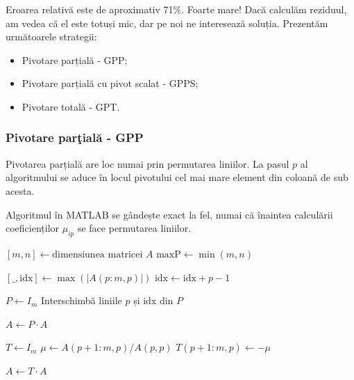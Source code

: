 \documentclass{exam}
\newcommand{\octavescript}[2]{
	
}
\begin{document}
Eroarea relativă este de aproximativ 71\%. Foarte mare! Dacă calculăm reziduul,
am vedea că el este totuși mic, dar pe noi ne interesează soluția. Prezentăm
următoarele strategii:

\begin{itemize}
	\item Pivotare parțială - GPP;
	\item Pivotare parțială cu pivot scalat - GPPS;
	\item Pivotare totală - GPT.
\end{itemize}

\subsubsection{Pivotare parţială - GPP}

Pivotarea parțială are loc numai prin permutarea liniilor. La pasul $p$ al
algoritmului se aduce în locul pivotului cel mai mare element din coloană de sub
acesta.

Algoritmul în MATLAB se gândește exact la fel, numai că înaintea calculării
coeficienților $\mu_{ip}$ se face permutarea liniilor.

\begin{algorithm}
	\caption{Eliminare Gaussiană cu pivotare parțială}
	\begin{algorithmic}[1]
		\State \( [m, n] \gets \text{dimensiunea matricei } A \)
		\State \( \text{maxP} \gets \min(m, n) \) 

		\State \( [\_, \text{idx}] \gets \max(|A(p:m, p)|) \) 
		\State \( \text{idx} \gets \text{idx} + p - 1 \) 

		\State \( P \gets I_m \) 
		\State Interschimbă liniile \( p \) și \( \text{idx} \) din \( P \)

		\State \( A \gets P \cdot A \) 

		\State \( T \gets I_m \) 
		\State \( \mu \gets A(p+1:m, p) / A(p, p) \) 
		\State \( T(p+1:m, p) \gets -\mu \) 

		\State \( A \gets T \cdot A \) 
		\EndFor
	\end{algorithmic}
\end{algorithm}
\end{document}
